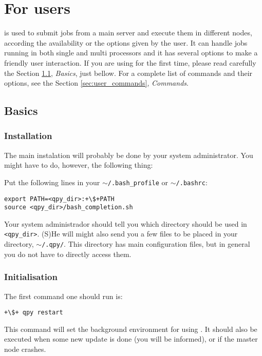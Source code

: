 \documentclass[a4paper,12pt]{article}
\begin{document}


\tableofcontents

\newpage
\section{For users}\label{sec:users}

\qpy{} is used to submit jobs from a main server and execute them in different nodes, according the availability or the options given by the user.
It can handle jobs running in both single and multi processors and it has several options to make a friendly user interaction.
If you are using \qpy{} for the first time, please read carefully the Section \ref{sec:user_basics}, \emph{Basics}, just bellow.
For a complete list of commands and their options, see the Section \ref{sec:user_commands}, \emph{Commands}.

\subsection{Basics}\label{sec:user_basics}

\subsubsection{Installation}

The main instalation will probably be done by your system administrator.
You might have to do, however, the following thing:

Put the following lines in your $\sim$\texttt{/.bash\_profile} or $\sim$\texttt{/.bashrc}:
\begin{lstlisting}[style=FileStyle]
export PATH=<qpy_dir>:+\$+PATH
source <qpy_dir>/bash_completion.sh
\end{lstlisting}
Your system administrador should tell you which directory should be used in \texttt{<qpy\_dir>}.
(S)He will might also send you a few files to be placed in your \qpy{} directory, $\sim$\texttt{/.qpy/}.
This directory has main configuration files, but in general you do not have to directly access them.

\subsubsection{Initialisation}

The first \qpy{} command one should run is:
\begin{lstlisting}[style=BashStyle]
+\$+ qpy restart
\end{lstlisting}
This command will set the background environment for using \qpy{}.
It should also be executed when some new update is done (you will be informed), or if the master node crashes.
\end{document}
